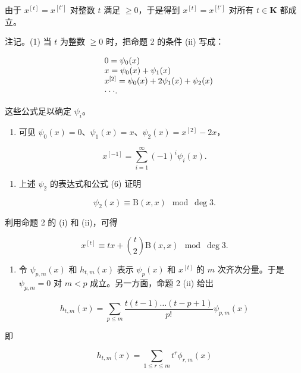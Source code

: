 由于 \(x^{[t]} = x^{[t']}\) 对整数 \(t\) 满足 \(\geqslant 0\)，于是得到 \(x^{[t]} = x^{[t']}\) 对所有 \(t \in \mathbf{K}\) 都成立。

注记。(1) 当 \(t\) 为整数 \(\geqslant 0\) 时，把命题 2 的条件 (ii) 写成：

\[
\begin{array}{r l} & 0 = \psi_ {0} (x) \\ & x = \psi_ {0} (x) + \psi_ {1} (x) \\ & x ^ {[ 2 ]} = \psi_ {0} (x) + 2 \psi_ {1} (x) + \psi_ {2} (x) \\ & \cdot \cdot \cdot . \end{array}
\]

这些公式足以确定 \(\psi_{i}\)。

\begin{enumerate}
\def\labelenumi{(\arabic{enumi})}
\setcounter{enumi}{1}
\tightlist
\item
  可见 \(\psi_0(x) = 0\)、\(\psi_1(x) = x\)、\(\psi_2(x) = x^{[2]} - 2x\)，
\end{enumerate}

\[
x ^ {[ - 1 ]} = \sum_ {i = 1} ^ {\infty} (- 1) ^ {i} \psi_ {i} (x).
\]

\begin{enumerate}
\def\labelenumi{(\arabic{enumi})}
\setcounter{enumi}{2}
\tightlist
\item
  上述 \(\psi_{2}\) 的表达式和公式 (6) 证明
\end{enumerate}

\[
\psi_ {2} (x) \equiv \mathrm{B} (x, x) \mod \deg 3.\tag{21}
\]

利用命题 2 的 (i) 和 (ii)，可得

\[
x ^ {[ t ]} \equiv t x + \binom {t} {2} \mathrm{B} (x, x) \mod \deg 3.\tag{22}
\]

\begin{enumerate}
\def\labelenumi{(\arabic{enumi})}
\setcounter{enumi}{3}
\tightlist
\item
  令 \(\psi_{p,m}(x)\) 和 \(h_{t,m}(x)\) 表示 \(\psi_p(x)\) 和 \(x^{[t]}\) 的 \(m\) 次齐次分量。于是 \(\psi_{p,m} = 0\) 对 \(m < p\) 成立。另一方面，命题 2 (ii) 给出
\end{enumerate}

\[
h _ {t, m} (x) = \sum_ {p \leqslant m} \frac {t (t - 1) \dots (t - p + 1)}{p !} \psi_ {p, m} (x)\tag{23}
\]

即

\[
h _ {t, m} (x) = \sum_ {1 \leqslant r \leqslant m} t ^ {r} \phi_ {r, m} (x)\tag{24}
\]

